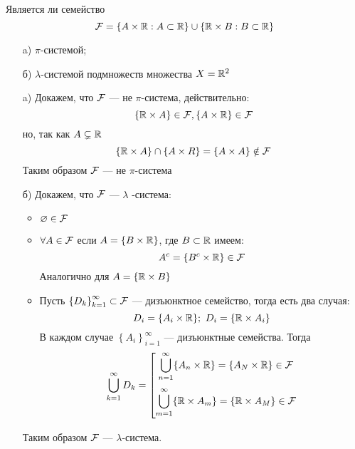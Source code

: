 \begin{task}{9}
	Является ли семейство 
	$$
	\mathcal{F}  = \{A \times \mathbb{R} : A \subset \mathbb{R}\} \cup \{\mathbb{R} \times B : B \subset \mathbb{R} \}
	$$
	
	\begin{itemize}
		\item[a)] $\pi$-системой;
		\item[б)] $\lambda$-системой подмножеств множества $X = \mathbb{R}^2$
	\end{itemize}
\end{task}

\begin{solution}
	\begin{enumerate}
		\item[a)] Докажем, что $\mathcal{F} $ --- не $\pi$-система, действительно:
		$$
		\{\mathbb{R}\times A\} \in \mathcal{F} , \{A \times \mathbb{R}\} \in \mathcal{F} 
		$$
		но, так как $A \subsetneq \mathbb{R}$
		$$
		\{\mathbb{R} \times A\} \cap \{A \times R\} = \{A \times A\} \notin \mathcal{F}  
		$$
		Таким образом $\mathcal{F} $ --- не $\pi$-система
		\item[б)] Докажем, что $\mathcal{F} $ --- $\lambda$ -система:
		\begin{itemize}
			\item $\varnothing \in \mathcal{F} $
			\item $\forall A \in \mathcal{F} $ если $A = \{B \times \mathbb{R} \}$, где $B \subset \mathbb{R}$ имеем: 
			$$
			A^c = \{B^c \times \mathbb{R} \} \in \mathcal{F} 
			$$ 
			Аналогично для $A = \{\mathbb{R} \times B\}$
			\item Пусть $\left\{ D_k \right\}_{k=1}^{\infty} \subset \mathcal{F} $ --- дизъюнктное семейство, тогда есть два случая: 
			$$
			D_i = \{A_i \times \mathbb{R} \}; ~ D_i = \{\mathbb{R} \times A_i\}
			$$
			В каждом случае $\left\{A_i\right\}_{i=1}^{\infty}$ --- дизъюнктные семейства.
			Тогда 
			$$
			\bigcup_{k=1}^{\infty} D_k = 
			\left[ 
			\begin{gathered} 
				\vspace{3px}
				\bigcup_{n=1}^{\infty} \{A_n \times \R\} = \{A_N \times \R \} \in \F
				\\ 
				\bigcup_{m=1}^{\infty} \{\R \times A_m\} = \{\R \times A_M\} \in \F
				\vspace{3px}
				\\ 
			\end{gathered} 
			\right.
			$$
		\end{itemize}
	Таким образом $\mathcal{F} $ --- $\lambda$-система.
	\end{enumerate}
	
\end{solution}